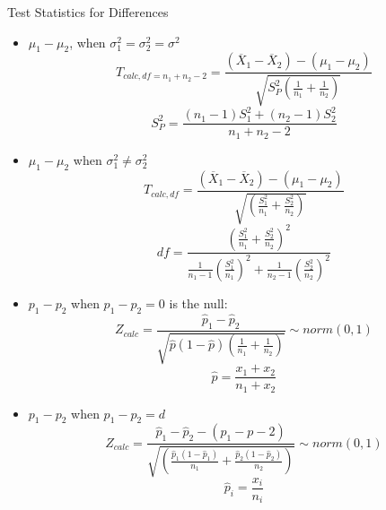 \documentclass[12pt, a4paper, twoside, openright, titlepage]{book}
\begin{document}
\begin{rmk}{Test Statistics for Differences}{}
    \leavevmode
    \begin{itemize}
        \item $\mu_1 - \mu_2$, when $\sigma_1^2 = \sigma_2^2 = \sigma^2$ \begin{equation*}
                T_{calc,df = n_1+n_2-2} = \frac{(\overline{X}_1 - \overline{X}_2) - (\mu_1 - \mu_2)}{\sqrt{S_P^2\left(\frac{1}{n_1} + \frac{1}{n_2}\right)}}
        \end{equation*}
            \begin{equation*}
                S_P^2 = \frac{(n_1 - 1)S_1^2 + (n_2-1)S_2^2}{n_1+n_2 -2}
            \end{equation*}
        \item $\mu_1 - \mu_2$ when $\sigma_1^2 \neq \sigma_2^2$ \begin{equation*}
                T_{calc,df} = \frac{(\overline{X}_1 - \overline{X}_2) - (\mu_1 - \mu_2)}{\sqrt{\left(\frac{S_1^2}{n_1} + \frac{S_2^2}{n_2}\right)}}
        \end{equation*}
            \begin{equation*}
                df = \frac{\left(\frac{S_1^2}{n_1} + \frac{S_2^2}{n_2}\right)^2}{\frac{1}{n_1-1}\left(\frac{S_1^2}{n_1}\right)^2 + \frac{1}{n_2-1}\left(\frac{S_2^2}{n_2}\right)^2}
            \end{equation*}
        \item $p_1 - p_2$ when $p_1 - p_2 = 0$ is the null: \begin{equation*}
                Z_{calc} = \frac{\hat{p}_1 - \hat{p}_2}{\sqrt{\hat{p}(1-\hat{p})\left(\frac{1}{n_1} + \frac{1}{n_2}\right)}} \sim norm(0,1)
        \end{equation*}
            \begin{equation*}
                \hat{p} = \frac{x_1+x_2}{n_1+x_2}
            \end{equation*}
        \item $p_1 - p_2$ when $p_1 - p_2 = d$ \begin{equation*}
                Z_{calc} = \frac{\hat{p}_1 - \hat{p}_2 - (p_1 - p-2)}{\sqrt{\left(\frac{\hat{p}_1(1-\hat{p}_1)}{n_1} + \frac{\hat{p}_2(1-\hat{p}_2)}{n_2}\right)}} \sim norm(0,1)
        \end{equation*}
            \begin{equation*}
                \hat{p}_i = \frac{x_i}{n_i}
            \end{equation*}
    \end{itemize}
\end{rmk}
\end{document}
